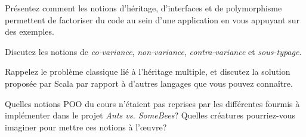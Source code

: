 \documentclass[a4paper,10pt]{article}
\begin{document}
\Question
Présentez comment les notions d'héritage, d'interfaces et de
polymorphisme permettent de factoriser du code au sein d’une
application en vous appuyant sur des exemples. 

\Question Discutez les notions de \emph{co-variance},
\emph{non-variance}, \emph{contra-variance} et
\emph{sous-typage}.

\Question Rappelez le problème classique lié à l’héritage multiple, et
discutez la solution proposée par Scala par rapport à d’autres
langages que vous pouvez connaître.

\Question Quelles notions POO du cours n'étaient pas reprises par les
différentes fourmis à implémenter dans le projet \textit{Ants
  vs. SomeBees}? Quelles créatures pourriez-vous imaginer pour mettre
ces notions à l'œuvre?







\end{document}
